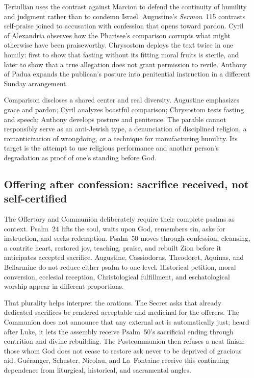 Tertullian uses the contrast against Marcion to defend the continuity of
humility and judgment rather than to condemn Israel. Augustine's
\emph{Sermon}~115 contrasts self-praise joined to accusation with confession
that opens toward pardon. Cyril of Alexandria observes how the Pharisee's
comparison corrupts what might otherwise have been praiseworthy. Chrysostom
deploys the text twice in one homily: first to show that fasting without its
fitting moral fruits is sterile, and later to show that a true allegation does
not grant permission to revile. Anthony of Padua expands the publican's
posture into penitential instruction in a different Sunday arrangement.

Comparison discloses a shared center and real diversity. Augustine emphasizes
grace and pardon; Cyril analyzes boastful comparison; Chrysostom tests fasting
and speech; Anthony develops posture and penitence. The parable cannot
responsibly serve as an anti-Jewish type, a denunciation of disciplined
religion, a romanticization of wrongdoing, or a technique for manufacturing
humility. Its target is the attempt to use religious performance and another
person's degradation as proof of one's standing before God.

\subsection*{Offering after confession: sacrifice received, not self-certified\enspace{}}

The Offertory and Communion deliberately require their complete psalms as
context. Psalm~24 lifts the soul, waits upon God, remembers sin, asks for
instruction, and seeks redemption. Psalm~50 moves through confession,
cleansing, a contrite heart, restored joy, teaching, praise, and rebuilt Zion
before it anticipates accepted sacrifice. Augustine, Cassiodorus, Theodoret,
Aquinas, and Bellarmine do not reduce either psalm to one level. Historical
petition, moral conversion, ecclesial reception, Christological fulfillment,
and eschatological worship appear in different proportions.

That plurality helps interpret the orations. The Secret asks that already
dedicated sacrifices be rendered acceptable and medicinal for the offerers.
The Communion does not announce that any external act is automatically just;
heard after Luke, it lets the assembly receive Psalm~50's sacrificial ending
through contrition and divine rebuilding. The Postcommunion then refuses a
neat finish: those whom God does not cease to restore ask never to be deprived
of gracious aid. Guéranger, Schuster, Nicolau, and La~Fontaine receive this
continuing dependence from liturgical, historical, and sacramental angles.

